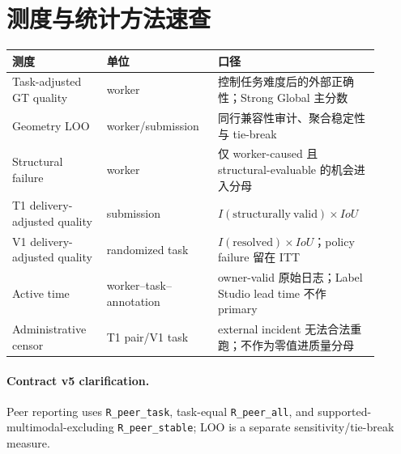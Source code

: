 \section{测度与统计方法速查}

\begin{longtable}{p{0.24\linewidth}p{0.28\linewidth}p{0.38\linewidth}}
\toprule
测度 & 单位 & 口径 \\
\midrule
\endhead
Task-adjusted GT quality & worker & 控制任务难度后的外部正确性；Strong Global 主分数 \\
Geometry LOO & worker/submission & 同行兼容性审计、聚合稳定性与 tie-break \\
Structural failure & worker & 仅 worker-caused 且 structural-evaluable 的机会进入分母 \\
T1 delivery-adjusted quality & submission & $I(\mathrm{structurally\ valid})\times IoU$ \\
V1 delivery-adjusted quality & randomized task & $I(\mathrm{resolved})\times IoU$；policy failure 留在 ITT \\
Active time & worker--task--annotation & owner-valid 原始日志；Label Studio lead time 不作 primary \\
Administrative censor & T1 pair/V1 task & external incident 无法合法重跑；不作为零值进质量分母 \\
\bottomrule
\end{longtable}

\paragraph{Contract v5 clarification.} Peer reporting uses \texttt{R\_peer\_task}, task-equal \texttt{R\_peer\_all}, and supported-multimodal-excluding \texttt{R\_peer\_stable}; LOO is a separate sensitivity/tie-break measure.
